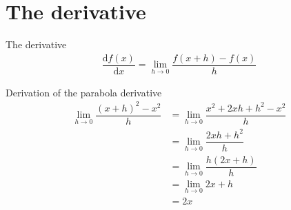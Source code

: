 \documentclass{beamer}
\begin{document}
    \section{The derivative}
    \begin{frame}{The derivative}
      \begin{align}
        \dfrac{\text{d} f(x)}{\text{d} x} = \lim_{h \rightarrow 0} \dfrac{f(x + h) - f(x)}{h}
      \end{align}
      \begin{figure}
        
      \end{figure}
    \end{frame}

    
    \begin{frame}{Derivation of the parabola derivative}
      \begin{align}
          \lim_{h \rightarrow 0} \dfrac{(x + h)^2 - x^2}{h} 
          & = \lim_{h \rightarrow 0} \dfrac{x^2 + 2xh + h^2 - x^2}{h}   \\
          & = \lim_{h \rightarrow 0} \dfrac{2xh + h^2}{h}  \\
          & = \lim_{h \rightarrow 0} \dfrac{h (2x + h)}{h}  \\
          & = \lim_{h \rightarrow 0} 2x + h \\
          & = 2x
      \end{align}
    \end{frame}
\end{document}
